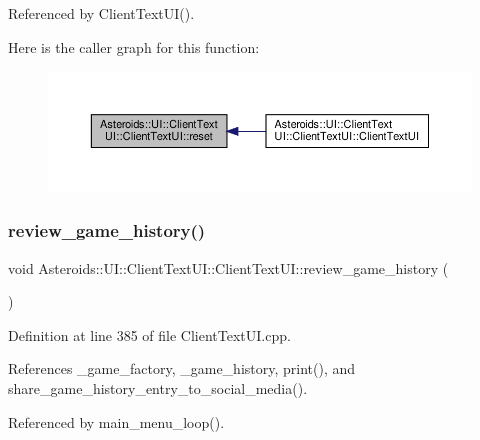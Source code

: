 Referenced by Client\+Text\+U\+I().

Here is the caller graph for this function\+:
\nopagebreak
\begin{figure}[H]
\begin{center}
\leavevmode
\includegraphics[width=350pt]{classAsteroids_1_1UI_1_1ClientTextUI_1_1ClientTextUI_a6efe3f748a4eee4913824be2aab9ab18_icgraph}
\end{center}
\end{figure}
\mbox{\label{classAsteroids_1_1UI_1_1ClientTextUI_1_1ClientTextUI_a27ec39f73edbb3688a3ebe67533abf5a}} 
\subsubsection{\texorpdfstring{review\+\_\+game\+\_\+history()}{review\_game\_history()}}
{\footnotesize\ttfamily void Asteroids\+::\+U\+I\+::\+Client\+Text\+U\+I\+::\+Client\+Text\+U\+I\+::review\+\_\+game\+\_\+history (\begin{DoxyParamCaption}{ }\end{DoxyParamCaption})\hspace{0.3cm}{\ttfamily [private]}}



Definition at line 385 of file Client\+Text\+U\+I.\+cpp.



References \+\_\+game\+\_\+factory, \+\_\+game\+\_\+history, print(), and share\+\_\+game\+\_\+history\+\_\+entry\+\_\+to\+\_\+social\+\_\+media().



Referenced by main\+\_\+menu\+\_\+loop().


